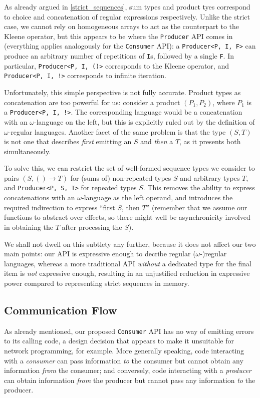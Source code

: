 \documentclass[sigplan,screen,10pt,anonymous,review]{acmart}
\begin{document}
As already argued in \cref{strict_sequences}, sum types and product tyes correspond to choice and concatenation of regular expressions respectively. Unlike the strict case, we cannot rely on homogeneous arrays to act as the counterpart to the Kleene operator, but this appears to be where the \texttt{Producer} API comes in (everything applies analogously for the \texttt{Consumer} API): a \texttt{Producer<P, I, F>} can produce an arbitrary number of repetitions of \texttt{I}s, followed by a single \texttt{F}. In particular, \texttt{Producer<P, I, ()>} corresponds to the Kleene operator, and \texttt{Producer<P, I, !>} corresponds to infinite iteration.

Unfortunately, this simple perspective is not fully accurate. Product types as concatenation are too powerful for us: consider a product $(P_1, P_2)$, where $P_1$ is a \texttt{Producer<P, I, !>}. The corresponding language would be a concatenation with an $\omega$-language on the left, but this is explicitly ruled out by the definition of $\omega$-regular languages. Another facet of the same problem is that the type $(S, T)$ is not one that describes \textit{first} emitting an $S$ and \textit{then} a $T$, as it presents both simultaneously.

To solve this, we can restrict the set of well-formed sequence types we consider to pairs $(S, () \rightarrow T)$ for (sums of) non-repeated types $S$ and arbitrary types $T$, and \texttt{Producer<P, S, T>} for repeated types $S$. This removes the ability to express concatenations with an $\omega$-language as the left operand, and introduces the required indirection to express ``first $S$, then $T$'' (remember that we assume our functions to abstract over effects, so there might well be asynchronicity involved in obtaining the $T$ after processing the $S$).

We shall not dwell on this subtlety any further, because it does not affect our two main points: our API is expressive enough to decribe regular ($\omega$-)regular languages, whereas a more traditional API \textit{without} a dedicated type for the final item is \textit{not} expressive enough, resulting in an unjustified reduction in expressive power compared to representing strict sequences in memory.

\subsection{Communication Flow}\label{communication_flow}

As already mentioned, our proposed \texttt{Consumer} API has no way of emitting errors to its calling code, a design decision that appears to make it unsuitable for network programming, for example. More generally speaking, code interacting with a \textit{consumer} can pass information \textit{to} the consumer but cannot obtain any information \textit{from} the consumer; and conversely, code interacting with a \textit{producer} can obtain information \textit{from} the producer but cannot pass any information \textit{to} the producer.
\end{document}
